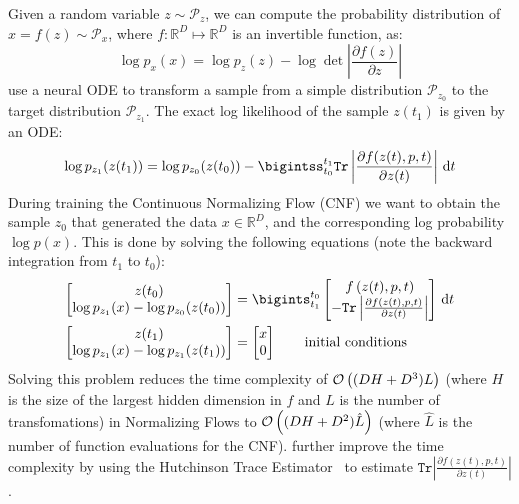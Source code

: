 Given a random variable $z \sim \mathcal{P}_z$, we can compute the probability distribution of $x = f(z) \sim \mathcal{P}_x$, where $f: \mathbb{R}^D \mapsto \mathbb{R}^D$ is an invertible function, as:
%
\begin{equation}
  \log{p_x(x)} = \log{p_z(z)} - \log{\det{\left| \frac{\partial f(z)}{\partial z} \right|}}
\end{equation}
%
\citet{chen2018neural} use a neural ODE to transform a sample from a simple distribution $\mathcal{P}_{z_0}$ to the target distribution $\mathcal{P}_{z_1}$. The exact log likelihood of the sample $z(t_1)$ is given by an ODE:
%
\begin{equation}
  \log{p_{z_1}(z(t_1))} = \log{p_{z_0}(z(t_0))} - \bigintss_{t_0}^{t_1} \texttt{Tr}\left| \frac{\partial f(z(t), p, t)}{\partial z(t)} \right| \, \dt
\end{equation}
%
During training the Continuous Normalizing Flow (CNF) we want to obtain the sample $z_0$ that generated the data $x \in \mathbb{R}^D$, and the corresponding log probability $\log{p(x)}$. This is done by solving the following equations (note the backward integration from $t_1$ to $t_0$):
%
\begin{align}
  \begin{bmatrix}
    z(t_0) \\
    \log{p_{z_1}(x)} - \log{p_{z_0}(z(t_0))}
  \end{bmatrix} & = \bigints_{t_1}^{t_0} \begin{bmatrix}
                                           \func{f}{z(t), p, t} \\
                                           -\texttt{Tr} \left| \frac{\partial f(z(t), p, t)}{\partial z(t)} \right|
                                         \end{bmatrix} \, \dt \\
  \begin{bmatrix}
    z(t_1) \\
    \log{p_{z_1}(x)} - \log{p_{z_1}(z(t_1))}
  \end{bmatrix} & = \begin{bmatrix}
                      x \\
                      0
                    \end{bmatrix} \qquad \text{initial conditions}
\end{align}
%
Solving this problem reduces the time complexity of $\mathcal{O}\left((DH + D^3)L\right)$ (where $H$ is the size of the largest hidden dimension in $f$ and $L$ is the number of transfomations) in Normalizing Flows to $\mathcal{O}\left((DH + D^2)\hat{L}\right)$ (where $\hat{L}$ is the number of function evaluations for the CNF). \citet{grathwohl2018ffjord} further improve the time complexity by using the Hutchinson Trace Estimator~\citep{hutchinson1989stochastic} to estimate $\texttt{Tr}\left| \frac{\partial f(z(t), p, t)}{\partial z(t)} \right|$.
